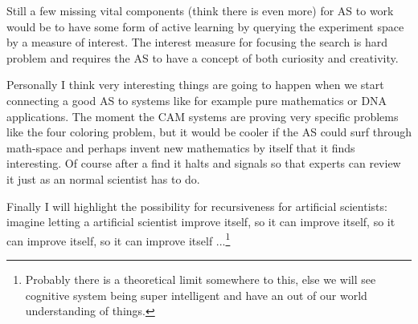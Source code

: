 \documentclass{article}
\begin{document}
    Still a few missing vital components (think there is even more) for AS to 
    work would be to have some form of active learning by querying the 
    experiment space by a 
    measure of interest. The interest measure for focusing the search is hard 
    problem and requires the AS to have a concept of both curiosity and 
    creativity.\cite{curiosity}

    Personally I think very interesting things are going to happen when we
    start connecting a good AS to systems like for example pure mathematics or 
    DNA applications. The moment the CAM systems are proving very specific
    problems like the four coloring problem, but it would be cooler if the AS
    could surf through math-space and perhaps invent new mathematics by itself 
    that it finds interesting. Of course after a find it halts and signals so
    that experts can review it just as an normal scientist has to do.

    Finally I will highlight the possibility for recursiveness for artificial
    scientists: imagine letting a artificial scientist improve itself, so it can
    improve itself, so it can improve itself, so it can improve itself
    ...\footnote{Probably there is a theoretical limit somewhere to this, else
    we will see cognitive system being super intelligent and have an out of our
    world understanding of things.}

    
    
\end{document}
